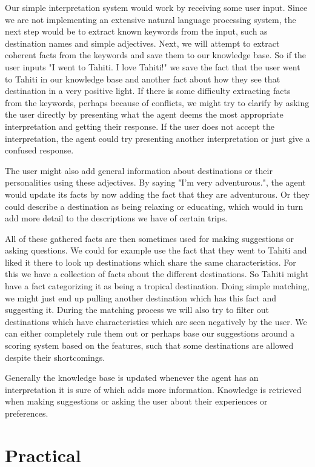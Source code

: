 \documentclass[11pt]{article} %
\begin{document}
Our simple interpretation system would work by receiving some user input. Since we are not implementing an extensive natural language processing system, the next step would be to extract known keywords from the input, such as destination names and simple adjectives. Next, we will attempt to extract coherent facts from the keywords and save them to our knowledge base. So if the user inputs "I went to Tahiti. I love Tahiti!"  we save the fact that the user went to Tahiti in our knowledge base and another fact about how they see that destination in a very positive light. If there is some difficulty extracting facts from the keywords, perhaps because of conflicts, we might try to clarify by asking the user directly by presenting what the agent deems the most appropriate interpretation and getting their response. If the user does not accept the interpretation, the agent could try presenting another interpretation or just give a confused response.

The user might also add general information about destinations or their personalities using these adjectives. By saying "I'm very adventurous.", the agent would update its facts by now adding the fact that they are adventurous. Or they could describe a destination as being relaxing or educating, which would in turn add more detail to the descriptions we have of certain trips.


All of these gathered facts are then sometimes used for making suggestions or asking questions. We could for example use the fact that they went to Tahiti and liked it there to look up destinations which share the same characteristics. For this we have a collection of facts about the different destinations. So Tahiti might have a fact categorizing it as being a tropical destination. Doing simple matching, we might just end up pulling another destination which has this fact and suggesting it. During the matching process we will also try to filter out destinations which have characteristics which are seen negatively by the user. We can either completely rule them out or perhaps base our suggestions around a scoring system based on the features, such that some destinations are allowed despite their shortcomings.


Generally the knowledge base is updated whenever the agent has an interpretation it is sure of which adds more information. Knowledge is retrieved when making suggestions or asking the user about their experiences or preferences.


\section{Practical}
\end{document}
